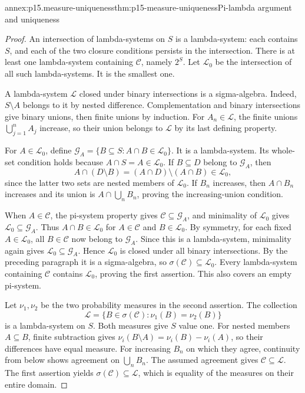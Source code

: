 \begin{annexitem}{annex:p15.measure-uniqueness}{thm:p15-measure-uniqueness}{Pi-lambda argument and uniqueness}
\begin{proof}
An intersection of lambda-systems on \(S\) is a lambda-system:
each contains \(S\), and each of the two closure conditions persists
in the intersection. There is at least one lambda-system containing
\(\mathcal C\), namely \(2^S\). Let \(\mathcal L_0\) be the
intersection of all such lambda-systems. It is the smallest one.

A lambda-system \(\mathcal L\) closed under binary intersections is
a sigma-algebra. Indeed, \(S\setminus A\) belongs to it by nested
difference. Complementation and binary intersections give binary unions,
then finite unions by induction. For \(A_n\in\mathcal L\), the
finite unions \(\bigcup_{j=1}^n A_j\) increase, so their union belongs
to \(\mathcal L\) by its last defining property.

For \(A\in\mathcal L_0\), define
\(\mathcal G_A=\{B\subseteq S:A\cap B\in\mathcal L_0\}\).
It is a lambda-system. Its whole-set condition holds because
\(A\cap S=A\in\mathcal L_0\). If \(B\subseteq D\) belong to
\(\mathcal G_A\), then
\[
 A\cap(D\setminus B)=(A\cap D)\setminus(A\cap B)\in\mathcal L_0,
\]
since the latter two sets are nested members of \(\mathcal L_0\).
If \(B_n\) increases, then \(A\cap B_n\) increases and its union
is \(A\cap\bigcup_n B_n\), proving the increasing-union condition.

When \(A\in\mathcal C\), the pi-system property gives
\(\mathcal C\subseteq\mathcal G_A\), and minimality of
\(\mathcal L_0\) gives \(\mathcal L_0\subseteq\mathcal G_A\).
Thus \(A\cap B\in\mathcal L_0\) for \(A\in\mathcal C\) and
\(B\in\mathcal L_0\). By symmetry, for each fixed
\(A\in\mathcal L_0\), all \(B\in\mathcal C\) now belong to
\(\mathcal G_A\). Since this is a lambda-system, minimality again
gives \(\mathcal L_0\subseteq\mathcal G_A\). Hence
\(\mathcal L_0\) is closed under all binary intersections. By the
preceding paragraph it is a sigma-algebra, so
\(\sigma(\mathcal C)\subseteq\mathcal L_0\). Every lambda-system
containing \(\mathcal C\) contains \(\mathcal L_0\), proving the
first assertion. This also covers an empty pi-system.

Let \(\nu_1,\nu_2\) be the two probability measures in the second
assertion. The collection
\[
 \mathcal L=\{B\in\sigma(\mathcal C):\nu_1(B)=\nu_2(B)\}
\]
is a lambda-system on \(S\). Both measures give \(S\) value one.
For nested members \(A\subseteq B\), finite subtraction gives
\(\nu_i(B\setminus A)=\nu_i(B)-\nu_i(A)\), so their differences
have equal measure. For increasing \(B_n\) on which they agree,
continuity from below shows agreement on \(\bigcup_n B_n\).
The assumed agreement gives \(\mathcal C\subseteq\mathcal L\).
The first assertion yields \(\sigma(\mathcal C)\subseteq\mathcal L\),
which is equality of the measures on their entire domain.
\end{proof}
\end{annexitem}

